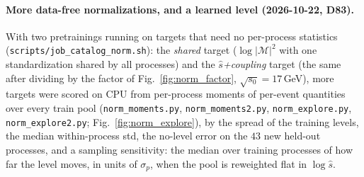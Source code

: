 \documentclass[11pt]{article}
\newcommand{\code}[1]{\texttt{#1}}
\begin{document}
\paragraph{More data-free normalizations, and a learned level (2026-10-22, D83).} With two pretrainings running on targets that need no per-process statistics
(\code{scripts/job\_catalog\_norm.sh}): the \emph{shared} target ($\log|\mathcal M|^2$ with one standardization shared by
all processes) and the \emph{$\hat s$+coupling} target (the same after dividing by the factor of
Fig.~\ref{fig:norm_factor}, $\sqrt{s_0}=17$\,GeV), more targets
were scored on CPU from per-process moments of per-event quantities over every train pool
(\code{norm\_moments.py}, \code{norm\_moments2.py}, \code{norm\_explore.py}, \code{norm\_explore2.py};
Fig.~\ref{fig:norm_explore}), by the spread of the training levels, the median within-process std, the no-level
error on the $43$ new held-out processes, and a sampling sensitivity: the median over training processes of how far
the level moves, in units of $\sigma_p$, when the pool is reweighted flat in $\log\hat s$.
\end{document}
